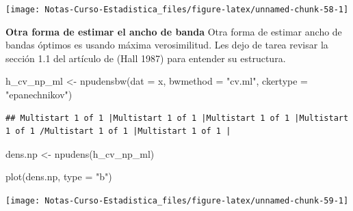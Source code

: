 \documentclass[
  12pt,
]{book}
\newenvironment{Shaded}{\begin{snugshade}}{\end{snugshade}}
\newcommand{\AttributeTok}[1]{\textcolor[rgb]{0.77,0.63,0.00}{#1}}
\newcommand{\FunctionTok}[1]{\textcolor[rgb]{0.00,0.00,0.00}{#1}}
\newcommand{\NormalTok}[1]{#1}
\newcommand{\OtherTok}[1]{\textcolor[rgb]{0.56,0.35,0.01}{#1}}
\newcommand{\StringTok}[1]{\textcolor[rgb]{0.31,0.60,0.02}{#1}}
\begin{document}
\begin{center}\texttt{[image: Notas-Curso-Estadistica\_files/figure-latex/unnamed-chunk-58-1]} \end{center}

\textbf{Otra forma de estimar el ancho de banda} Otra forma de estimar
ancho de bandas óptimos es usando máxima verosimilitud. Les dejo de
tarea revisar la sección 1.1 del artículo de (Hall 1987) para entender
su estructura.

\begin{Shaded}
\begin{Highlighting}[]
\NormalTok{h\_cv\_np\_ml }\OtherTok{\textless{}{-}} \FunctionTok{npudensbw}\NormalTok{(}\AttributeTok{dat =}\NormalTok{ x, }\AttributeTok{bwmethod =} \StringTok{"cv.ml"}\NormalTok{,}
    \AttributeTok{ckertype =} \StringTok{"epanechnikov"}\NormalTok{)}
\end{Highlighting}
\end{Shaded}

\begin{verbatim}
## Multistart 1 of 1 |Multistart 1 of 1 |Multistart 1 of 1 |Multistart 1 of 1 /Multistart 1 of 1 |Multistart 1 of 1 |                   
\end{verbatim}

\begin{Shaded}
\begin{Highlighting}[]
\NormalTok{dens.np }\OtherTok{\textless{}{-}} \FunctionTok{npudens}\NormalTok{(h\_cv\_np\_ml)}

\FunctionTok{plot}\NormalTok{(dens.np, }\AttributeTok{type =} \StringTok{"b"}\NormalTok{)}
\end{Highlighting}
\end{Shaded}

\begin{center}\texttt{[image: Notas-Curso-Estadistica\_files/figure-latex/unnamed-chunk-59-1]} \end{center}
\end{document}
